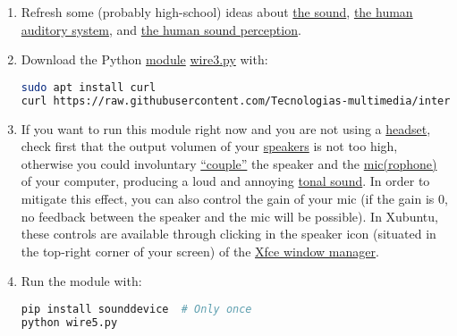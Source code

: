 \begin{enumerate}

\item Refresh some (probably high-school) ideas about
  \href{https://vicente-gonzalez-ruiz.github.io/the_sound/}{the
    sound}, \href{https://vicente-gonzalez-ruiz.github.io/human_auditory_system/}{the
    human auditory system},
    and \href{https://vicente-gonzalez-ruiz.github.io/human_sound_perception/}{the
    human sound perception}. %
  
\item Download the Python
  \href{https://docs.python.org/3/tutorial/modules.html}{module}
  \href{https://raw.githubusercontent.com/Tecnologias-multimedia/intercom/master/test/sounddevice/wire3.py}{wire3.py} with:

  \begin{lstlisting}[language=Bash]
sudo apt install curl
curl https://raw.githubusercontent.com/Tecnologias-multimedia/intercom/master/test/sounddevice/wire5.py > wire5.py
  \end{lstlisting}      

\item If you want to run this module right now and you are not using a
  \href{https://en.wikipedia.org/wiki/Headset_(audio)}{headset}, check
  first that the output volumen of your
  \href{https://en.wikipedia.org/wiki/Headset_(audio)}{speakers} is
  not too high, otherwise you could involuntary
  \href{https://www.youtube.com/watch?v=rI90lhYAffo}{``couple''} the
  speaker and the
  \href{https://en.wikipedia.org/wiki/Microphone}{mic(rophone)} of
  your computer, producing a loud and annoying
  \href{https://www.cirrusresearch.co.uk/blog/2012/03/tonal-noise-analysis-with-the-optimus-green-sound-level-meters/}{tonal
    sound}. In order to mitigate this
  effect, you can also control the gain of your mic (if the
  gain is 0, no feedback between the speaker and the mic will be
  possible). In Xubuntu, these controls are available through clicking in
  the speaker icon (situated in the top-right corner of your screen)
  of the \href{https://www.xfce.org/}{Xfce window manager}.

\item Run the module with:

  \begin{lstlisting}[language=Bash]
pip install sounddevice  # Only once
python wire5.py
  \end{lstlisting}


\end{enumerate}
